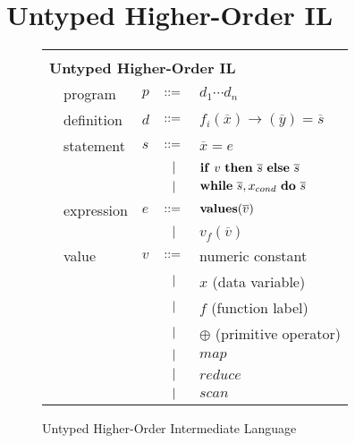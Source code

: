 \documentclass[preprint]{sigplanconf}
\begin{document}
\section{Untyped Higher-Order IL}
\begin{figure}[h!]
  \begin{tabular}{| m{0.01cm}m{1.5cm}m{0.1cm}m{0.2cm}p{4.5cm} |}
  \hline
  & & & &\\ 
   \multicolumn{5}{|l|}{\textbf{Untyped Higher-Order IL}}  \\[4pt]
  & program & $p$ &  $::=$   &  $d_1 \cdots d_n $ \\[4pt]
  & definition & $d$ & $::=$ & $f_i(\overline{x}) \rightarrow (\overline{y}) = \overline{s}$ \\[4pt]
  & statement  & $s$ & $::=$ & $\overline{x} = e $\\[2pt]
  &            &     & $\ \ | \ \ $    & $\mbox{\textbf{if}} ~v~ \mbox{\textbf{then}} ~ \overline{s} ~ \mbox{\textbf{else}} ~ \overline{s} $ \\[2pt]
  &            &     & $\ \ | \ \ $    & $\mbox{\textbf{while}} ~\overline{s}, x_{cond} ~ \mbox{\textbf{do}} ~\overline{s}~ $  \\[5pt]
  & expression & $e$ & $::=$ & $\mbox{\textbf{values}} (\overline{v})$ \\[2pt]
  &            &     & $\ \ | \ \ $    & $ v_f (\overline{v}) $ \\[9pt]
  & value      & $v$ & $::=$ & numeric constant\\[2pt]
  &            &     & $\ \ | \ \ $    &  $x$  \quad \small{(data variable)} \\[2pt]
  &            &     & $\ \ | \ \ $    &  $f$  \quad \small{(function label)} \\[2pt]
  &            &     & $\ \ | \ \ $    &  $\oplus$ \quad \small{(primitive operator)} \\[2pt]
  &            &     & $\ \ | \ \ $    & $map$\\[2pt]
  &            &     & $\ \ | \ \ $    & $reduce$ \\[2pt]
  &            &     & $\ \ | \ \ $    & $scan$\\[5pt]
  \hline
  \end{tabular}
\caption{Untyped Higher-Order Intermediate Language}
\end{figure}
\end{document}
